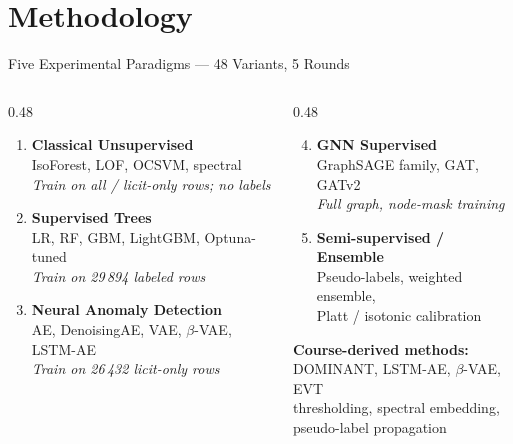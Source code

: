 \documentclass[aspectratio=169,11pt]{beamer}
\begin{document}
\section{Methodology}

\begin{frame}{Five Experimental Paradigms --- 48 Variants, 5 Rounds}
  \begin{columns}[T]
    \begin{column}{0.48\textwidth}
      \begin{enumerate}
        \item \textbf{Classical Unsupervised}\\
              IsoForest, LOF, OCSVM, spectral\\
              \textit{Train on all / licit-only rows; no labels}
        \item \textbf{Supervised Trees}\\
              LR, RF, GBM, LightGBM, Optuna-tuned\\
              \textit{Train on 29\,894 labeled rows}
        \item \textbf{Neural Anomaly Detection}\\
              AE, DenoisingAE, VAE, $\beta$-VAE, LSTM-AE\\
              \textit{Train on 26\,432 licit-only rows}
      \end{enumerate}
    \end{column}
    \begin{column}{0.48\textwidth}
      \begin{enumerate}
        \setcounter{enumi}{3}
        \item \textbf{GNN Supervised}\\
              GraphSAGE family, GAT, GATv2\\
              \textit{Full graph, node-mask training}
        \item \textbf{Semi-supervised / Ensemble}\\
              Pseudo-labels, weighted ensemble,\\
              Platt / isotonic calibration
      \end{enumerate}
      \vspace{8pt}
      \colorbox{primary!10}{\parbox{\linewidth}{
        \small \textbf{Course-derived methods:}\\
        DOMINANT, LSTM-AE, $\beta$-VAE, EVT\\
        thresholding, spectral embedding,\\
        pseudo-label propagation
      }}
    \end{column}
  \end{columns}
\end{frame}
\end{document}
